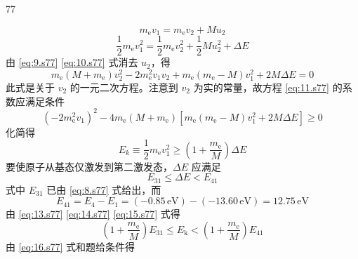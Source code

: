 \begin{solution}{77}
\begin{subsolution}
        \begin{equation}
            m_{\mathrm{e}} v_{1} = m_{\mathrm{e}} v_{2} + M u_{2}
            \label{eq:9.s77}
        \end{equation}
        \begin{equation}
            \frac{1}{2} m_{\mathrm{e}} v_{1}^{2} = \frac{1}{2} m_{\mathrm{e}} v_{2}^{2} + \frac{1}{2} M u_{2}^{2} + \Delta E
            \label{eq:10.s77}
        \end{equation}
        由 \eqref{eq:9.s77} \eqref{eq:10.s77} 式消去 $u_{2}$，得
        \begin{equation}
            m_{\mathrm{e}} (M + m_{\mathrm{e}}) v_{2}^{2} - 2 m_{\mathrm{e}}^{2} v_{1} v_{2} + m_{\mathrm{e}} (m_{\mathrm{e}} - M) v_{1}^{2} + 2 M \Delta E = 0
            \label{eq:11.s77}
        \end{equation}
        此式是关于 $v_{2}$ 的一元二次方程。注意到 $v_{2}$ 为实的常量，故方程 \eqref{eq:11.s77} 的系数应满足条件
        \begin{equation}
            (-2 m_{\mathrm{e}}^{2} v_{1})^{2} - 4 m_{\mathrm{e}} (M + m_{\mathrm{e}}) [ m_{\mathrm{e}} (m_{\mathrm{e}} - M) v_{1}^{2} + 2 M \Delta E ] \geq 0
            \label{eq:12.s77}
        \end{equation}
        化简得
        \begin{equation}
            E_{k} \equiv \frac{1}{2} m_{\mathrm{e}} v_{1}^{2} \geq \left(1 + \frac{m_{\mathrm{e}}}{M}\right) \Delta E
            \label{eq:13.s77}
        \end{equation}
        要使原子从基态仅激发到第二激发态，$\Delta E$ 应满足
        \begin{equation}
            E_{31} \leq \Delta E < E_{41}
            \label{eq:14.s77}
        \end{equation}
        式中 $E_{31}$ 已由 \eqref{eq:8.s77} 式给出，而
        \begin{equation}
            E_{41} = E_{4} - E_{1} = (-0.85\,\mathrm{eV}) - (-13.60\,\mathrm{eV}) = 12.75\,\mathrm{eV}
            \label{eq:15.s77}
        \end{equation}
        由 \eqref{eq:13.s77} \eqref{eq:14.s77} \eqref{eq:15.s77} 式得
        \begin{equation}
            \left(1 + \frac{m_{\mathrm{e}}}{M}\right) E_{31} \leq E_{\mathrm{k}} < \left(1 + \frac{m_{\mathrm{e}}}{M}\right) E_{41}
            \label{eq:16.s77}
        \end{equation}
        由 \eqref{eq:16.s77} 式和题给条件得
        \begin{equation}

\end{equation}
\end{subsolution}
\end{solution}
